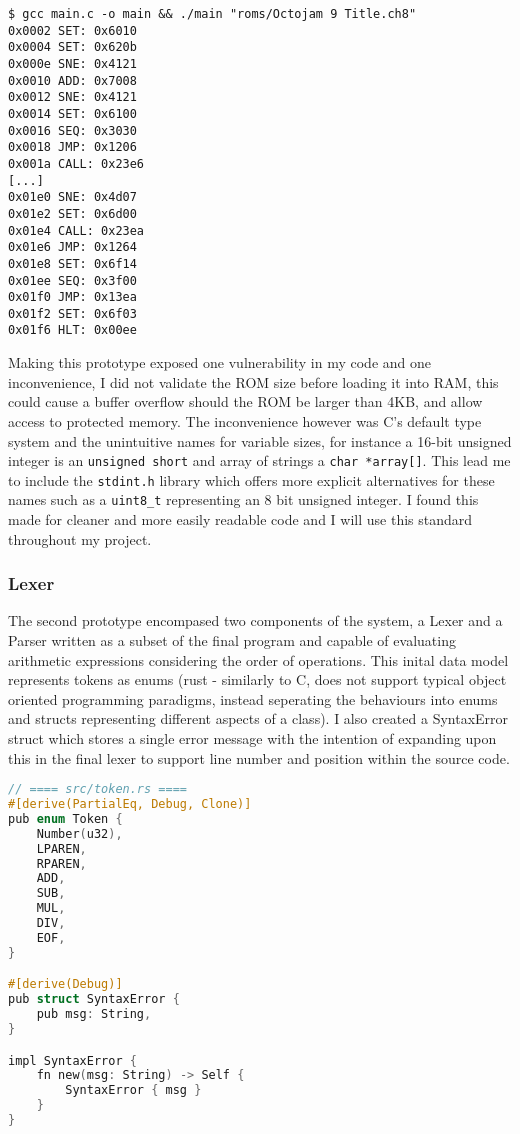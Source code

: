 \begin{lstlisting}
$ gcc main.c -o main && ./main "roms/Octojam 9 Title.ch8"
0x0002 SET: 0x6010
0x0004 SET: 0x620b
0x000e SNE: 0x4121
0x0010 ADD: 0x7008
0x0012 SNE: 0x4121
0x0014 SET: 0x6100
0x0016 SEQ: 0x3030
0x0018 JMP: 0x1206
0x001a CALL: 0x23e6
[...]
0x01e0 SNE: 0x4d07
0x01e2 SET: 0x6d00
0x01e4 CALL: 0x23ea
0x01e6 JMP: 0x1264
0x01e8 SET: 0x6f14
0x01ee SEQ: 0x3f00
0x01f0 JMP: 0x13ea
0x01f2 SET: 0x6f03
0x01f6 HLT: 0x00ee
\end{lstlisting}

Making this prototype exposed one vulnerability in my code and one inconvenience, I did not validate the ROM size before loading it into RAM, this could cause a buffer overflow should the ROM be larger than 4KB, and allow access to protected memory. The inconvenience however was C's default type system and the unintuitive names for variable sizes, for instance a 16-bit unsigned integer is an \texttt{unsigned short} and array of strings a \texttt{char *array[]}. This lead me to include the \texttt{stdint.h} library which offers more explicit alternatives for these names such as a \texttt{uint8\_t} representing an 8 bit unsigned integer. I found this made for cleaner and more easily readable code and I will use this standard throughout my project. 

\subsubsection{Lexer}
The second prototype encompased two components of the system, a Lexer and a Parser written as a subset of the final program and capable of evaluating arithmetic expressions considering the order of operations. This inital data model represents tokens as enums (rust - similarly to C, does not support typical object oriented programming paradigms, instead seperating the behaviours into enums and structs representing different aspects of a class). I also created a SyntaxError struct which stores a single error message with the intention of expanding upon this in the final lexer to support line number and position within the source code.

\begin{lstlisting}[language={C}]
// ==== src/token.rs ====
#[derive(PartialEq, Debug, Clone)]
pub enum Token {
    Number(u32),
    LPAREN,
    RPAREN,
    ADD,
    SUB,
    MUL,
    DIV,
    EOF,
}

#[derive(Debug)]
pub struct SyntaxError {
    pub msg: String,
}

impl SyntaxError {
    fn new(msg: String) -> Self {
        SyntaxError { msg }
    }
}
\end{lstlisting}


